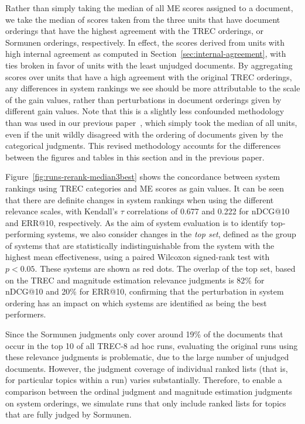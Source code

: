 Rather than simply taking the median of all ME scores assigned to a
document, we take the median of scores taken from the three units that
have document orderings that have the highest agreement with the TREC
orderings, or Sormunen orderings, respectively.
In effect, the scores derived from units with high internal agreement
as computed in Section~\ref{sec:internal-agreement}, with ties broken
in favor of units with the least unjudged documents.
By aggregating scores over units that have a high agreement with the
original TREC orderings, any differences in system rankings we see
should be more attributable to the scale of the gain values, rather
than perturbations in document orderings given by different gain
values.
Note that this is a slightly less confounded methodology 
than was used in our previous paper~\cite{ME-SIGIR15}, which simply
took the median of all units, even if the unit wildly disagreed with
the ordering of documents given by the categorical judgments.
This revised methodology accounts for the differences between the
figures and tables in this section and in the previous paper.

Figure~\ref{fig:runs-rerank-median3best} shows the concordance between
system rankings using TREC categories and ME scores as gain values.
It can be seen that there are definite changes in system rankings when
using the different relevance scales, with Kendall's $\tau$
correlations of 0.677 and 0.222 for nDCG@10 and ERR@10, respectively.
As the aim of system evaluation is to identify top-performing systems,
we also consider changes in the \emph{top set}, defined as the group of
systems that are statistically indistinguishable from the system with
the highest mean effectiveness, using a paired Wilcoxon signed-rank
test with $p<0.05$.
These systems are shown as red dots.
The overlap of the top set, based on the TREC and magnitude estimation
relevance judgments is 82\% for nDCG@10 and 20\% for ERR@10, confirming
that the perturbation in system ordering has an impact on which systems
are identified as being the best performers.

Since the Sormunen judgments only cover around 19\% of the documents
that occur in the top 10 of all TREC-8 ad hoc runs, evaluating the
original runs using these relevance judgments is problematic, due to
the large number of unjudged documents.
However, the judgment coverage of individual ranked lists (that is,
for particular topics within a run) varies substantially.
Therefore, to enable a comparison between the ordinal judgment and
magnitude estimation judgments on system orderings, we simulate 
runs that only include ranked lists for topics that are fully judged by
Sormunen.

